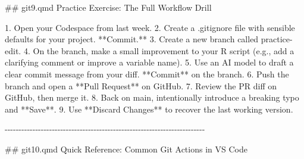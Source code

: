 \documentclass[
  letterpaper,
  DIV=11,
  numbers=noendperiod,
  oneside]{scrreprt}
\newenvironment{Shaded}{\begin{snugshade}}{\end{snugshade}}
\newcommand{\FunctionTok}[1]{\textcolor[rgb]{0.28,0.35,0.67}{#1}}
\newcommand{\InformationTok}[1]{\textcolor[rgb]{0.37,0.37,0.37}{#1}}
\newcommand{\NormalTok}[1]{\textcolor[rgb]{0.00,0.23,0.31}{#1}}
\newcommand{\SpecialStringTok}[1]{\textcolor[rgb]{0.13,0.47,0.30}{#1}}
\begin{document}
\begin{Shaded}
\begin{Highlighting}[numbers=left,,]
\FunctionTok{\#\# \textasciigrave{}git9.qmd\textasciigrave{} Practice Exercise: The Full Workflow Drill}

\SpecialStringTok{1.  }\NormalTok{Open your Codespace from last week.}
\SpecialStringTok{2.  }\NormalTok{Create a }\InformationTok{\textasciigrave{}.gitignore\textasciigrave{}}\NormalTok{ file with sensible defaults for your project. **Commit.**}
\SpecialStringTok{3.  }\NormalTok{Create a new branch called }\InformationTok{\textasciigrave{}practice{-}edit\textasciigrave{}}\NormalTok{.}
\SpecialStringTok{4.  }\NormalTok{On the branch, make a small improvement to your R script (e.g., add a clarifying comment or improve a variable name).}
\SpecialStringTok{5.  }\NormalTok{Use an AI model to draft a clear commit message from your diff. **Commit** on the branch.}
\SpecialStringTok{6.  }\NormalTok{Push the branch and open a **Pull Request** on GitHub.}
\SpecialStringTok{7.  }\NormalTok{Review the PR diff on GitHub, then merge it.}
\SpecialStringTok{8.  }\NormalTok{Back on }\InformationTok{\textasciigrave{}main\textasciigrave{}}\NormalTok{, intentionally introduce a breaking typo and **Save**.}
\SpecialStringTok{9.  }\NormalTok{Use **Discard Changes** to recover the last working version.}

\NormalTok{{-}{-}{-}{-}{-}{-}{-}{-}{-}{-}{-}{-}{-}{-}{-}{-}{-}{-}{-}{-}{-}{-}{-}{-}{-}{-}{-}{-}{-}{-}{-}{-}{-}{-}{-}{-}{-}{-}{-}{-}{-}{-}{-}{-}{-}{-}{-}{-}{-}{-}{-}{-}{-}{-}{-}{-}{-}{-}{-}{-}{-}{-}{-}{-}{-}{-}{-}{-}{-}{-}{-}{-}}

\FunctionTok{\#\# \textasciigrave{}git10.qmd\textasciigrave{} Quick Reference: Common Git Actions in VS Code}


\end{Highlighting}
\end{Shaded}
\end{document}
